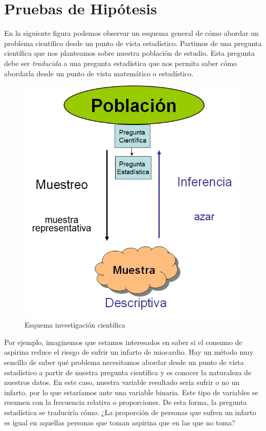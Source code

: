 \documentclass[
]{book}
\begin{document}
\hypertarget{pruebas-de-hipuxf3tesis}{%
\chapter{Pruebas de Hipótesis}\label{pruebas-de-hipuxf3tesis}}

En la siguiente figura podemos observar un esquema general de cómo abordar un problema científico desde un punto de vista estadístico. Partimos de una pregunta científica que nos planteamos sobre nuestra población de estudio. Esta pregunta debe ser \emph{traducida} a una pregunta estadística que nos permita saber cómo abordarla desde un punto de vista matemático o estadístico.

\begin{figure}
\centering
\includegraphics[width=\textwidth,height=12cm]{figures/schemeStatistics.jpg}
\caption{Esquema investigación científica}
\end{figure}

Por ejemplo, imaginemos que estamos interesados en saber si el consumo de aspirina reduce el riesgo de sufrir un infarto de miocardio. Hay un método muy sencillo de saber qué problema necesitamos abordar desde un punto de vista estadístico a partir de nuestra pregunta científica y es conocer la naturaleza de nuestros datos. En este caso, nuestra variable resultado sería sufrir o no un infarto, por lo que estaríamos ante una variable binaria. Este tipo de variables se resumen con la frecuencia relativa o proporciones. De esta forma, la pregunta estadística se traduciría cómo: ¿La proporción de personas que sufren un infarto es igual en aquellas personas que toman aspirina que en las que no toma?
\end{document}

